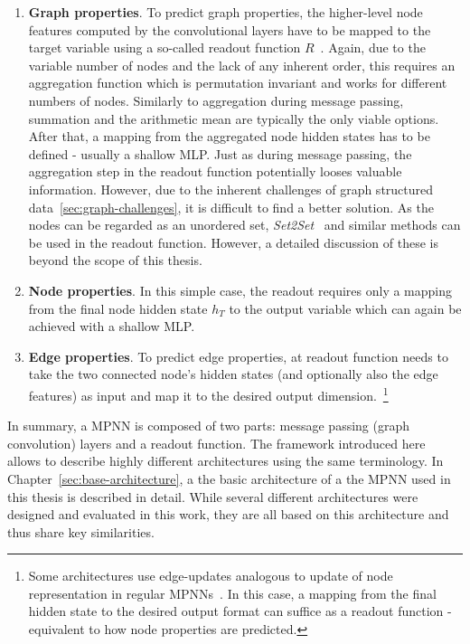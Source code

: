\begin{enumerate}
	\item \textbf{Graph properties}. To predict graph properties, the higher-level node features computed by the convolutional layers have to be mapped to the target variable using a so-called readout function $R$~\cite{Gilmer2017}. Again, due to the variable number of nodes and the lack of any inherent order, this requires an aggregation function which is permutation invariant and works for different numbers of nodes. Similarly to aggregation during message passing, summation and the arithmetic mean are typically the only viable options. After that, a mapping from the aggregated node hidden states has to be defined - usually a shallow MLP.
	Just as during message passing, the aggregation step in the readout function potentially looses valuable information. However, due to the inherent challenges of graph structured data~\ref{sec:graph-challenges}, it is difficult to find a better solution. As the nodes can be regarded as an unordered set, \textit{Set2Set}~\cite{Vinyals2015} and similar methods can be used in the readout function. However, a detailed discussion of these is beyond the scope of this thesis.
	\item \textbf{Node properties}. In this simple case, the readout requires only a mapping from the final node hidden state $h_T$ to the output variable which can again be achieved with a shallow MLP.
	\item \textbf{Edge properties}. To predict edge properties, at readout function needs to take the two connected node's hidden states (and optionally also the edge features) as input and map it to the desired output dimension.~\footnote{Some architectures use edge-updates analogous to update of node representation in regular MPNNs~\cite{Jørgensen2018}. In this case, a mapping from the final hidden state to the desired output format can suffice as a readout function - equivalent to how node properties are predicted.}
\end{enumerate}


In summary, a MPNN is composed of two parts: message passing (graph convolution) layers and a readout function. The framework introduced here allows to describe highly different architectures using the same terminology. In Chapter~\ref{sec:base-architecture}, a the basic architecture of a the MPNN used in this thesis is described in detail. While several different architectures were designed and evaluated in this work, they are all based on this architecture and thus share key similarities.


